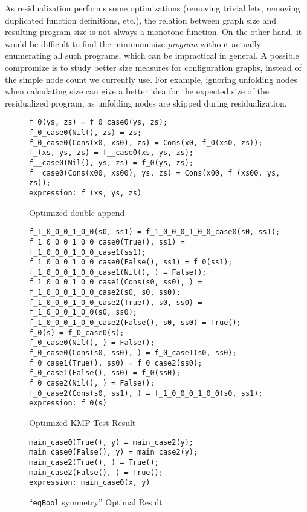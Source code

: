 \documentclass[submission,copyright,creativecommons]{eptcs}
\begin{document}
\begin{itemize}
    As residualization performs some optimizations (removing trivial lets, removing duplicated
    function definitions, etc.), the relation between graph size and resulting program size
    is not always a monotone function.
    On the other hand, it would be difficult to find the minimum-size \emph{program}
    without actually enumerating all such programs, which can be impractical in general.
    A possible compromize is to study better size measures for configuration graphs, instead
    of the simple node count we currently use.
    For example, ignoring unfolding nodes when calculating size can give a better idea for the expected size
    of the residualized program, as unfolding nodes are skipped during residualization.
    
\end{itemize}

\begin{figure}
\begin{lstlisting}
f_0(ys, zs) = f_0_case0(ys, zs);
f_0_case0(Nil(), zs) = zs;
f_0_case0(Cons(x0, xs0), zs) = Cons(x0, f_0(xs0, zs));
f_(xs, ys, zs) = f__case0(xs, ys, zs);
f__case0(Nil(), ys, zs) = f_0(ys, zs);
f__case0(Cons(x00, xs00), ys, zs) = Cons(x00, f_(xs00, ys, zs));
expression: f_(xs, ys, zs)
\end{lstlisting}
\caption{Optimized double-append}
\label{fig:DoubleAppResult}
\end{figure}

\begin{figure}
\begin{lstlisting}
f_1_0_0_0_1_0_0(s0, ss1) = f_1_0_0_0_1_0_0_case0(s0, ss1);
f_1_0_0_0_1_0_0_case0(True(), ss1) = f_1_0_0_0_1_0_0_case1(ss1);
f_1_0_0_0_1_0_0_case0(False(), ss1) = f_0(ss1);
f_1_0_0_0_1_0_0_case1(Nil(), ) = False();
f_1_0_0_0_1_0_0_case1(Cons(s0, ss0), ) = f_1_0_0_0_1_0_0_case2(s0, s0, ss0);
f_1_0_0_0_1_0_0_case2(True(), s0, ss0) = f_1_0_0_0_1_0_0(s0, ss0);
f_1_0_0_0_1_0_0_case2(False(), s0, ss0) = True();
f_0(s) = f_0_case0(s);
f_0_case0(Nil(), ) = False();
f_0_case0(Cons(s0, ss0), ) = f_0_case1(s0, ss0);
f_0_case1(True(), ss0) = f_0_case2(ss0);
f_0_case1(False(), ss0) = f_0(ss0);
f_0_case2(Nil(), ) = False();
f_0_case2(Cons(s0, ss1), ) = f_1_0_0_0_1_0_0(s0, ss1);
expression: f_0(s)
\end{lstlisting}
\caption{Optimized KMP Test Result}
\label{fig:KMPResult}
\end{figure}

\begin{figure}
\begin{lstlisting}
main_case0(True(), y) = main_case2(y);
main_case0(False(), y) = main_case2(y);
main_case2(True(), ) = True();
main_case2(False(), ) = True();
expression: main_case0(x, y)
\end{lstlisting}
\caption{``\texttt{eqBool} symmetry'' Optimal Result}
\label{fig:BoolEqSymResult}
\end{figure}
\end{document}
